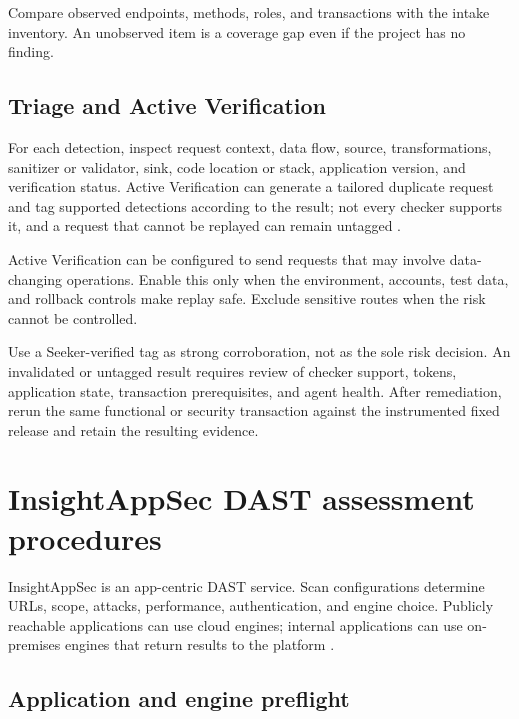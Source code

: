 \documentclass[11pt,letterpaper]{article}
\begin{document}
Compare observed endpoints, methods, roles, and transactions with the intake inventory. An unobserved item is a coverage gap even if the project has no finding.

\subsection{Triage and Active Verification}

For each detection, inspect request context, data flow, source, transformations, sanitizer or validator, sink, code location or stack, application version, and verification status. Active Verification can generate a tailored duplicate request and tag supported detections according to the result; not every checker supports it, and a request that cannot be replayed can remain untagged \citep{seekeractive}.

\begin{warnbox}
Active Verification can be configured to send requests that may involve data-changing operations. Enable this only when the environment, accounts, test data, and rollback controls make replay safe. Exclude sensitive routes when the risk cannot be controlled.
\end{warnbox}

Use a Seeker-verified tag as strong corroboration, not as the sole risk decision. An invalidated or untagged result requires review of checker support, tokens, application state, transaction prerequisites, and agent health. After remediation, rerun the same functional or security transaction against the instrumented fixed release and retain the resulting evidence.

\section{InsightAppSec DAST assessment procedures}

InsightAppSec is an app-centric DAST service. Scan configurations determine URLs, scope, attacks, performance, authentication, and engine choice. Publicly reachable applications can use cloud engines; internal applications can use on-premises engines that return results to the platform \citep{rapid7home,rapid7engine}.

\subsection{Application and engine preflight}
\end{document}
